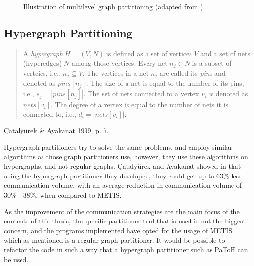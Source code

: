 \begin{figure}[H]
    \centering
    \caption{Illustration of multilevel graph partitioning (adapted from \cite{karypis1997metis}).}
    \label{fig:coarseninggraph}
\end{figure}

\subsection{Hypergraph Partitioning}
\begin{quote}
    A \emph{hypergraph} \(H = (V,N)\) is defined as a set of vertices \(V\) and a set of nets (hyperedges) \(N\) among those vertices. Every net \(n_{j} \in N\) is a subset of vertcies, i.e., \(n_{j} \subseteq V\). The vertices in a net \(n_{j}\) are called its \textit{pins} and denoted as \(pins[n_{j}]\). The size of a net is equal to the number of its pins, i.e., \(s_{j} = \left|  pins[n_{j}] \right|\). The set of nets connected to a vertex \(v_{i}\) is denoted as \(nets[v_{i}]\). The degree of a vertex is equal to the number of nets it is connected to, i.e., \(d_{i} = \left| nets[v_{i}] \right|\).
\end{quote}

\begin{flushright}
    \c{C}ataly\"{u}rek \& Ayakanat 1999, p. 7. \cite{hypergraphpartitioning}
\end{flushright}
\medskip
Hypergraph partitioners try to solve the same problems, and employ similar algorithms as those graph partitioners use, however, they use these algorithms on hypergraphs, and not regular graphs. \c{C}ataly\"{u}rek and Ayakanat showed in \cite{hypergraphpartitioning} that using the hypergraph partitioner they developed, they could get up to 63\% less communication volume, with an average reduction in communication volume of 30\% - 38\%, when compared to METIS.
\medskip

As the improvement of the communication strategies are the main focus of the contents of this thesis, the specific partitioner tool that is used is not the biggest concern, and the programs implemented have opted for the usage of METIS, which as mentioned is a regular graph partitioner. It would be possible to refactor the code in such a way that a hypergraph partitioner such as PaToH can be used.




